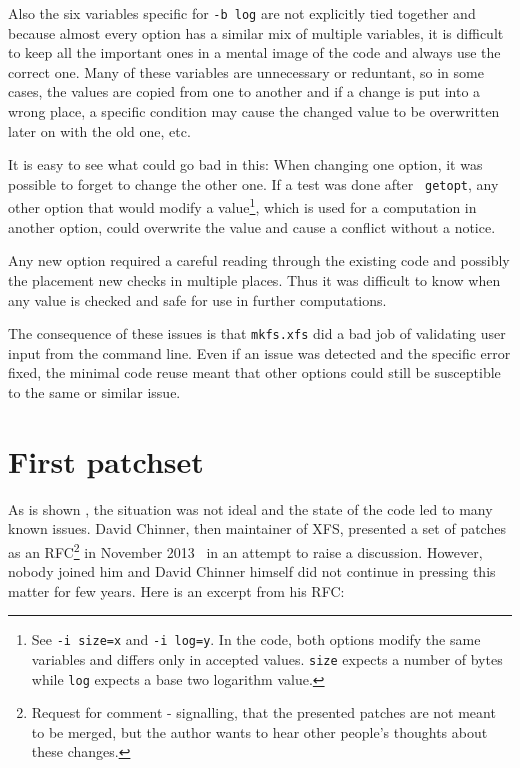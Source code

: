 Also the six variables specific for {\tt -b log} are not explicitly tied
together and because almost every option has a similar mix of multiple
variables, it is difficult to keep all the important ones in a mental image
of the code and always use the correct one. Many of these variables are
unnecessary or reduntant, so in some cases, the values are copied from one
to another and if a change is put into a wrong place, a specific condition
may cause the changed value to be overwritten later on with the old one,
etc.

It is easy to see what could go bad in this: When changing one option, it was
possible to forget to change the other one. If a test was done after {\tt
getopt}, any other option that would modify a value\footnote{See {\tt -i
size=x} and {\tt -i log=y}. In the code, both options modify the same variables
and differs only in accepted values. {\tt size} expects a number of bytes while
{\tt log} expects a base two logarithm value.}, which is used for a computation
in another option, could overwrite the value and cause a conflict without a
notice.

Any new option required a careful reading through the existing code and
possibly the placement new checks in multiple places. Thus it was difficult to know
when any value is checked and safe for use in further computations.

The consequence of these issues is that {\tt mkfs.xfs} did a bad job of
validating user input from the command line. Even if an issue was detected
and the specific error fixed, the minimal code reuse meant that other
options could still be susceptible to the same or similar issue.

\section{First patchset}\label{chap:refactoring:first}

As is shown , the situation was not ideal and the
state of the code led to many known issues. David Chinner, then maintainer
of XFS, presented a set of patches as an RFC\footnote{Request for comment -
	signalling, that the presented patches are not meant to be merged,
but the author wants to hear other people's thoughts about these changes.}
in November 2013~\cite{davidsPatches} in an attempt to raise a discussion.
However, nobody joined him and David Chinner himself did not continue in
pressing this matter for few years. Here is an excerpt from his RFC:

